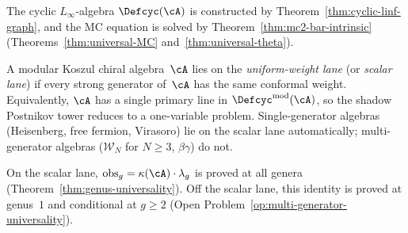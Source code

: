 \begin{definition}
\smallskip\noindent
The cyclic $L_\infty$-algebra $\Defcyc(\cA)$ is constructed
by Theorem~\ref{thm:cyclic-linf-graph}, and the MC equation
is solved by Theorem~\ref{thm:mc2-bar-intrinsic}
(Theorems~\ref{thm:universal-MC}
and~\ref{thm:universal-theta}).
\end{definition}

\begin{definition}
\label{def:scalar-lane}
\label{def:uniform-weight-lane}
A modular Koszul chiral algebra~$\cA$ lies on the
\emph{uniform-weight lane} (or \emph{scalar lane}) if every
strong generator of~$\cA$ has the same conformal weight.
Equivalently, $\cA$ has a single primary line in
$\Defcyc^{\mathrm{mod}}(\cA)$, so the shadow Postnikov tower
reduces to a one-variable problem.
Single-generator algebras (Heisenberg, free fermion, Virasoro)
lie on the scalar lane automatically; multi-generator algebras
($\mathcal{W}_N$ for $N \geq 3$, $\beta\gamma$) do not.

On the scalar lane, $\mathrm{obs}_g = \kappa(\cA)\cdot\lambda_g$
is proved at all genera
(Theorem~\ref{thm:genus-universality}).
Off the scalar lane, this identity is proved at genus~$1$
and conditional at $g \geq 2$
(Open Problem~\ref{op:multi-generator-universality}).
\end{definition}


